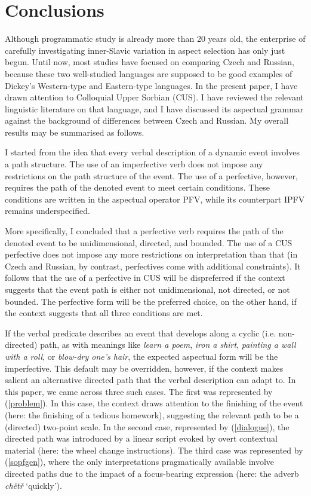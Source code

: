\documentclass[output=paper,colorlinks,citecolor=brown]{langscibook}
\begin{document}
\section{Conclusions}\label{mueller:sec:fin}
Although  programmatic study is already more than 20 years old,
the enterprise of carefully investigating inner-Slavic variation in aspect selection has only just begun.  
Until now, most studies have focused on comparing Czech and Russian, because these two well-studied languages are supposed to be good examples of Dickey's 
Western-type and Eastern-type languages. In the present paper, I have drawn attention to Colloquial Upper Sorbian (CUS). I have reviewed the relevant linguistic literature on that language, and I have discussed its aspectual grammar  
against the background of differences between Czech and Russian. 
My overall results may be summarised as follows. 

I started from the idea that every verbal description of a dynamic event involves a path structure. The use of an imperfective  
verb does not impose any restrictions on the path structure 
of the event. The use of a perfective, however, requires the path of the denoted event to meet certain conditions. These conditions are written in the aspectual operator PFV, while its counterpart IPFV remains underspecified. 

More specifically, I concluded that a perfective verb requires 
the path of the denoted event to be unidimensional, directed, and bounded. 
The use of a CUS perfective does not impose any more 
restrictions on interpretation than that (in Czech and Russian, by contrast, perfectives come with additional constraints). 
It follows that the use of a perfective in CUS will be dispreferred if the context suggests that the event path is either not unidimensional, not directed, or not bounded. The perfective form will be the preferred choice, on the other hand, if the context suggests that all three conditions are met. 

If the verbal predicate describes an event that develops along a cyclic (i.e. non-directed) path, as with meanings like \textit{learn a poem}, 
\textit{iron a shirt}, 
\textit{painting a wall with a roll}, or \textit{blow-dry one's hair}, the expected aspectual form will be the imperfective. 
This default may be overridden, however, if the context makes salient an alternative directed path that the verbal description can adapt to. In this paper, we came across three such cases. The first was represented by (\ref{problem}). In this case, the context draws attention to the finishing of the event (here: the finishing of a tedious homework), suggesting the relevant path to be a (directed) two-point scale. In the second case, represented by (\ref{dialogue}), the directed path was introduced by a linear script evoked by overt contextual material (here: the wheel change instructions).  
The third case was represented by (\ref{sopfgen}), where 
the only interpretations pragmatically available involve directed paths due to the impact of a focus-bearing expression (here: the adverb \textit{chětř} `quickly').
\end{document}
